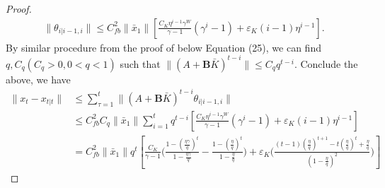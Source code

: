 \documentclass{article}
\begin{document}
\begin{proof}
\begin{align*}
    \|\theta_{i|i-1,i}\| \leq C_{fb}^{2}\|\bar{x}_{1}\|[\frac{C_{K}\eta^{i-1}\gamma^{W}}{\gamma-1}(\gamma^{i}-1) + \varepsilon_{K}(i-1)\eta^{i-1}].
\end{align*}
By similar procedure from the proof of \cite[Lemma 10]{chen_regret_2022} below Equation (25), we can find $q,C_{q}(C_{q}>0,0<q<1)$ such that $\|(A+\mathbf{B}\bar{K})^{t-i}\| \leq C_{q}q^{t-i}$. Conclude the above, we have
\begin{align*}
    \|x_{t}-x_{t|t}\| &\leq \sum_{\tau=1}^{t}\|(A+\mathbf{B}\bar{K})^{t-i}\theta_{i|i-1,i}\|\\
    &\leq C_{fb}^{2}C_{q}\|\bar{x}_{1}\|\sum_{i=1}^{t}q^{t-i}[\frac{C_{K}\eta^{i-1}\gamma^{W}}{\gamma-1}(\gamma^{i}-1) + \varepsilon_{K}(i-1)\eta^{i-1}]\\
    &= C_{fb}^{2}\|\bar{x}_{1}\|q^{t}[\frac{C_{K}}{\gamma-1}\bigg(\frac{1-(\frac{\eta\gamma}{q})^{t}}{1-\frac{\eta\gamma}{q}} - \frac{1-(\frac{\eta}{q})^{t}}{1-\frac{\eta}{q}} \bigg)+\varepsilon_{K}\bigg(\frac{(t-1)(\frac{\eta}{q})^{t+1}-t(\frac{\eta}{q})^{t}+\frac{\eta}{q}}{(1-\frac{\eta}{q})^{2}}\bigg)]
\end{align*}
\end{proof}
\end{document}
